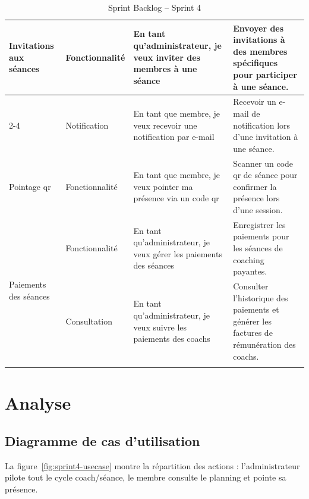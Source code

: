 ﻿\documentclass[../main.tex]{subfiles}
\begin{document}
\begin{longtable}{|p{2.5cm}|p{2cm}|p{4cm}|p{5.5cm}|}
\multirow{2}{*}{\parbox{2.5cm}{Invitations aux s\'{e}ances}} & Fonctionnalit\'{e} & En tant qu'administrateur, je veux inviter des membres \`{a} une s\'{e}ance & Envoyer des invitations \`{a} des membres sp\'{e}cifiques pour participer \`{a} une s\'{e}ance. \\
\cline{2-4}
 & Notification & En tant que membre, je veux recevoir une notification par e-mail & Recevoir un e-mail de notification lors d'une invitation \`{a} une s\'{e}ance. \\
\hline

\multirow{1}{*}{\parbox{2.5cm}{Pointage \acrshort{qr}}} & Fonctionnalit\'{e} & En tant que membre, je veux pointer ma pr\'{e}sence via un code \acrshort{qr} & Scanner un code \acrshort{qr} de s\'{e}ance pour confirmer la pr\'{e}sence lors d'une session. \\
\hline

\multirow{2}{*}{\parbox{2.5cm}{Paiements des s\'{e}ances}} & Fonctionnalit\'{e} & En tant qu'administrateur, je veux g\'{e}rer les paiements des s\'{e}ances & Enregistrer les paiements pour les s\'{e}ances de coaching payantes. \\
\cline{2-4}
 & Consultation & En tant qu'administrateur, je veux suivre les paiements des coachs & Consulter l'historique des paiements et g\'{e}n\'{e}rer les factures de r\'{e}mun\'{e}ration des coachs. \\
\hline
\caption{Sprint Backlog -- Sprint 4}
\label{tab:backlog_sprint4}
\end{longtable}

\section{Analyse}

\subsection{Diagramme de cas d'utilisation}

La figure~\ref{fig:sprint4-usecase} montre la r\'{e}partition des actions : l'administrateur pilote tout le cycle coach/s\'{e}ance, le membre consulte le planning et pointe sa pr\'{e}sence.
\end{document}
